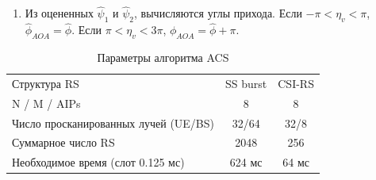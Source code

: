 \begin{enumerate}[label=\textbf{Шаг \arabic*:}]
\begin{equation}
\begin{pmatrix}
{                  1 & \exp{i\eta_3} & \exp{i2\eta_3} & \dots & \exp{i7\eta_3} \\
                  1 & \exp{i\eta_4} & \exp{i2\eta_4} & \dots & \exp{i7\eta_4} \\
                  }
              \end{pmatrix}^T
          \end{equation}.
          Обновляется $\eta_{v_2}$ и повторяется шаг 5 до тех пор, пока не будет
          достигнута необходимая точность. Получаем $\hat \psi_2 = (\eta_{v_2} + \pi)\mod(2\pi) - \pi$, где $(x \mod  y)$ -- остаток от деления $x$ на $y$.
    \item Из оцененных $\hat \psi_1$ и $\hat \psi_2$, вычисляются углы прихода. Если $-\pi < \eta_v < \pi$,
          $\hat \phi_{AOA} = \hat \phi$. Если $\pi < \eta_v < 3\pi$, $\phi_{AOA} = \hat \phi + \pi$.
\end{enumerate}
\begin{table}[h!]
    \centering
    \caption{Параметры алгоритма ACS}
    \begin{tabular}{lcc}
        \toprule
        \midrule
        Структура RS                         & SS burst & CSI-RS \\
        N / M / AIPs                         & 8        & 8      \\
        Число просканированных лучей (UE/BS) & 32/64    & 32/8   \\
        Суммарное число RS                   & 2048     & 256    \\
        Необходимое время (слот 0.125 мс)    & 624 мс   & 64 мс  \\
        \hline
    \end{tabular}
\end{table}
